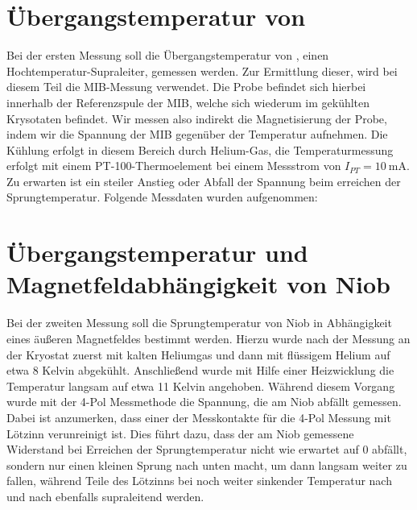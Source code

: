 \documentclass[bigchapter,colorback,accentcolor=tud4b,linedtoc,11pt]{tudreport}
\numberwithin{equation}{subsection}
\begin{document}
\section{Übergangstemperatur von }
Bei der ersten Messung soll die Übergangstemperatur von , einen Hochtemperatur-Supraleiter, gemessen werden. Zur Ermittlung dieser, wird bei diesem Teil die MIB-Messung verwendet. Die Probe befindet sich hierbei innerhalb der Referenzspule der MIB, welche sich wiederum im gekühlten Krysotaten befindet. Wir messen also indirekt die Magnetisierung der Probe, indem wir die Spannung der MIB gegenüber der Temperatur aufnehmen. Die Kühlung erfolgt in diesem Bereich durch Helium-Gas, die Temperaturmessung erfolgt mit einem PT-100-Thermoelement bei einem Messstrom von $I_{PT} = 10 \ \mathrm{mA}$. Zu erwarten ist ein steiler Anstieg oder Abfall der Spannung beim erreichen der Sprungtemperatur. Folgende Messdaten wurden aufgenommen:

\begin{center}
\begin{figure}[h]
\end{figure}
\end{center}

\section{Übergangstemperatur und Magnetfeldabhängigkeit von Niob}
Bei der zweiten Messung soll die Sprungtemperatur von Niob in Abhängigkeit eines äußeren Magnetfeldes bestimmt werden. Hierzu wurde nach der Messung an  der Kryostat zuerst mit kalten Heliumgas und dann mit flüssigem Helium auf etwa 8 Kelvin abgekühlt. Anschließend wurde mit Hilfe einer Heizwicklung die Temperatur langsam auf etwa 11 Kelvin angehoben. Während diesem Vorgang wurde mit der 4-Pol Messmethode die Spannung, die am Niob abfällt gemessen. Dabei ist anzumerken, dass einer der Messkontakte für die 4-Pol Messung mit Lötzinn verunreinigt ist. Dies führt dazu, dass der am Niob gemessene Widerstand bei Erreichen der Sprungtemperatur nicht wie erwartet auf 0 abfällt, sondern nur einen kleinen Sprung nach unten macht, um dann langsam weiter zu fallen, während Teile des Lötzinns bei noch weiter sinkender Temperatur nach und nach ebenfalls supraleitend werden.
\end{document}
